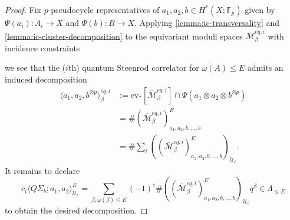 \documentclass[reqno]{amsart}
\numberwithin{equation}{section}
\numberwithin{equation}{section}
\numberwithin{equation}{section}
\theoremstyle{definition}
\theoremstyle{remark}
\theoremstyle{remark}
\newcommand{\ov}{\overline}
\begin{document}
\begin{proof}
    Fix $p$-pseudocycle representatives of $a_1, a_2, b \in H^*(X;\mathbb{F}_p)$ given by $\Psi(a_i) : A_i \to X$ and $\Psi(b) : B \to X$. Applying \cref{lemma:ic-transversality} and \cref{lemma:ic-cluster-decomposition} to the equivariant moduli spaces $\ov{\mathcal{M}}_\beta^{eq, i}$ with incidence constraints
\begin{center}
\end{center}
we see that the ($i$th) quantum Steenrod correlator for $\omega(A) \le E$ admits an induced decomposition
\begin{align}
    \langle a_1, a_2, b^{\otimes p}\rangle_\beta^{eq, i} &:= \mathrm{ev}_* [\ov{\mathcal{M}}^{eq, i}_\beta] \cap \Psi(a_1 \otimes a_2 \otimes b^{\otimes p}) \\
    &=\# (\ov{\mathcal{M}}^{eq,i}_\beta)^E_{a_1, a_2, b, \dots, b} \\
    &= \# \sum_\ell \left( (\ov{\mathcal{M}}^{eq,i}_\beta)^E_{a_1, a_2, b, \dots, b} \right)_{\mathcal{U}_\ell}.
\end{align}
It remains to declare
\begin{equation}
    c_i \langle Q\Sigma_b; a_1, a_2 \rangle^E_{\mathcal{U}_\ell} = \sum_{\beta, \omega(\beta) \le E} (-1)^\dagger \#  \left( (\ov{\mathcal{M}}^{eq,i}_\beta)^E_{a_1, a_2, b, \dots, b} \right)_{\mathcal{U}_\ell} q^\beta \in \Lambda_{\le E}
\end{equation}
to obtain the desired decomposition.
\end{proof}



\end{document}
